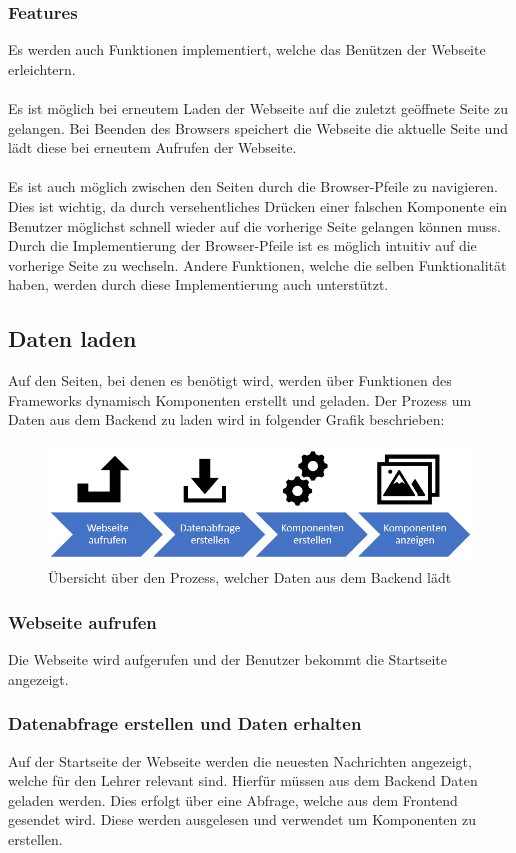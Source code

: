 \subsubsection{Features}
Es werden auch Funktionen implementiert, welche das Benützen der Webseite erleichtern.
\\\\
Es ist möglich bei erneutem Laden der Webseite auf die zuletzt geöffnete Seite zu gelangen. Bei Beenden des Browsers speichert die Webseite die aktuelle Seite und lädt diese bei erneutem Aufrufen der Webseite.
\\\\
Es ist auch möglich zwischen den Seiten durch die Browser-Pfeile zu navigieren. Dies ist wichtig, da durch versehentliches Drücken einer falschen Komponente ein Benutzer möglichst schnell wieder auf die vorherige Seite gelangen können muss. Durch die Implementierung der Browser-Pfeile ist es möglich intuitiv auf die vorherige Seite zu wechseln. Andere Funktionen, welche die selben Funktionalität haben, werden durch diese Implementierung auch unterstützt.
\newpage
\subsection{Daten laden}
Auf den Seiten, bei denen es benötigt wird, werden über Funktionen des Frameworks dynamisch Komponenten erstellt und geladen. Der Prozess um Daten aus dem Backend zu laden wird in folgender Grafik beschrieben:
\begin{figure}[H]
	\centering
	\includegraphics[width=0.8\linewidth]{images/Prozess_Daten_laden}
	\caption[Prozess der Daten zur Anzeige]{Übersicht über den Prozess, welcher Daten aus dem Backend lädt}
	\label{fig:prozessdatenladen}
\end{figure}

\subsubsection{Webseite aufrufen}
Die Webseite wird aufgerufen und der Benutzer bekommt die Startseite angezeigt.

\subsubsection{Datenabfrage erstellen und Daten erhalten}
Auf der Startseite der Webseite werden die neuesten Nachrichten angezeigt, welche für den Lehrer relevant sind. Hierfür müssen aus dem Backend Daten geladen werden. Dies erfolgt über eine Abfrage, welche aus dem Frontend gesendet wird. Diese werden ausgelesen und verwendet um Komponenten zu erstellen.

